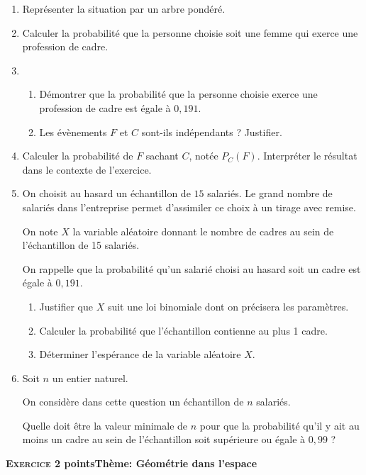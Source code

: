 \documentclass[10pt,a4paper]{article}
\begin{document}
\begin{enumerate}
\item Représenter la situation par un arbre pondéré.
\item Calculer la probabilité que la personne choisie soit une femme qui exerce une profession de cadre.
\item 
	\begin{enumerate}
		\item Démontrer que la probabilité que la personne choisie exerce une profession de cadre est égale à $0,191$.
		\item Les évènements $F$ et $C$ sont-ils indépendants ? Justifier.
	\end{enumerate}	
\item Calculer la probabilité de $F$ sachant $C$, notée $P_C(F)$. Interpréter le résultat dans le
contexte de l'exercice.
\item On choisit au hasard un échantillon de $15$ salariés. Le grand nombre de salariés
dans l'entreprise permet d'assimiler ce choix à un tirage avec remise.

On note $X$ la variable aléatoire donnant le nombre de cadres au sein de
l'échantillon de 15 salariés.

On rappelle que la probabilité qu'un salarié choisi au hasard soit un cadre est
égale à $0,191$.
	\begin{enumerate}
		\item Justifier que $X$ suit une loi binomiale dont on précisera les paramètres.
		\item Calculer la probabilité que l'échantillon contienne au plus 1 cadre.
		\item Déterminer l'espérance de la variable aléatoire $X$.
	\end{enumerate}	
\item Soit $n$ un entier naturel.

On considère dans cette question un échantillon de $n$ salariés.

Quelle doit être la valeur minimale de $n$ pour que la probabilité qu'il y ait au moins un cadre au sein de l'échantillon soit supérieure ou égale à $0,99$ ?
\end{enumerate}

\bigskip

\textbf{\textsc{Exercice 2}  points\hfill Thème: Géométrie dans l'espace}
\end{document}
